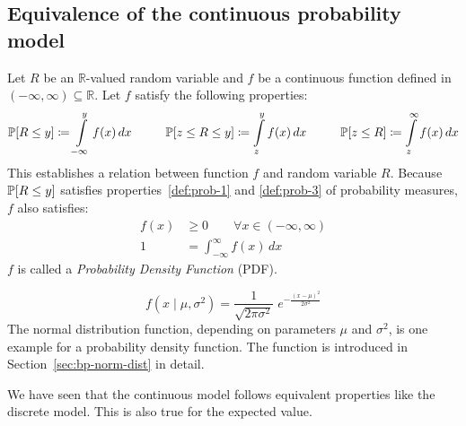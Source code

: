 \subsection{Equivalence of the continuous probability model}
\label{sec:bp-continuous}
%
\begin{definition}
  Let $R$ be an $\mathbb R$-valued random variable and
  $f$ be a continuous function defined in $(-\infty, \infty) \subseteq \mathbb R$.
  Let $f$ satisfy the following properties:
  \[
    \mathbb P[R \leq y] \coloneqq \int\limits_{-\infty}^y f(x) \, dx \hspace{28pt}
    \mathbb P[z \leq R \leq y] \coloneqq \int\limits_z^y f(x) \, dx \hspace{28pt}
    \mathbb P[z \leq R] \coloneqq \int\limits_z^\infty f(x) \, dx
  \]
  This establishes a relation between function $f$ and random variable $R$.
  Because $\mathbb P[R \leq y]$ satisfies properties~\ref{def:prob-1} and \ref{def:prob-3} of probability measures,
  $f$ also satisfies:
  \begin{align}
    f(x) &\geq 0 \qquad \forall x \in (-\infty, \infty) \label{prop:pdf1} \\
       1 &= \int_{-\infty}^{\infty} f(x) \, dx \label{prop:pdf2}
  \end{align}
  $f$ is called a \emph{Probability Density Function} (PDF).
\end{definition}
\begin{example}
  \[ f(x \; | \; \mu, \sigma^2) = \frac{1}{\sqrt{2\pi\sigma^2} } \; e^{ -\frac{(x-\mu)^2}{2\sigma^2} } \]
  The normal distribution function, depending on parameters $\mu$ and $\sigma^2$, is one example for a probability density function.
  The function is introduced in Section~\ref{sec:bp-norm-dist} in detail.
\end{example}

We have seen that the continuous model follows equivalent properties like the discrete model.
This is also true for the expected value.

